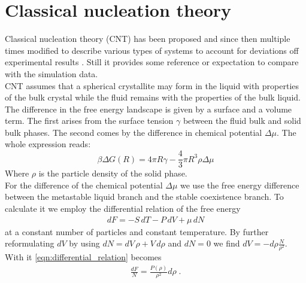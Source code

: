 \section{Classical nucleation theory }
\label{sec:CNT}
Classical nucleation theory (CNT) has been proposed  and since then multiple times modified to describe various types of systems to account for deviations off experimental results . Still it provides some reference  or expectation to compare with the simulation data.\\

CNT assumes that a spherical crystallite may form in the liquid with properties of the bulk crystal while the fluid remains with the properties of the bulk liquid. The difference in the free energy landscape is given by a surface and a volume term. The first arises from the surface tension $\gamma$ between the fluid bulk and solid bulk phases. The second comes by the difference in chemical potential $\Delta \mu$. The whole expression reads:
\begin{equation}
\label{eqn:free_energy}
\beta \Delta G(R) =4 \pi R \gamma -\frac{4}{3} \pi R^3 \rho \Delta \mu  
\end{equation}
Where $\rho$ is the particle density of the solid phase.\\

For the difference of the chemical potential $\Delta \mu $ we use the free energy difference between the metastable liquid branch and the stable coexistence branch. To calculate it we employ the differential relation of the free energy
\begin{align}
\label{eqn:differential_relation}
dF = -S  \, dT -P \, dV + \mu  \, dN
\end{align}
at a constant number of particles and constant temperature. By further reformulating $dV$ by using $ dN = dV  \, \rho + V  \, d\rho  $ and $dN = 0 $ we find  $ dV = -d\rho \frac{N}{\rho^2}$. With it \autoref{eqn:differential_relation} becomes
\begin{align}
\label{eqn:df_relation}
\frac{dF}{N} = \frac{P(\rho)}{\rho^2} d\rho \; \text{.}
\end{align}

